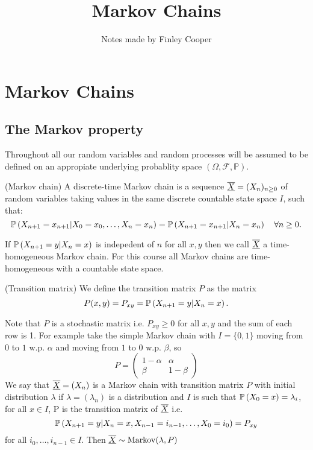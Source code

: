\documentclass{article}
\title{Markov Chains}
\author{Notes made by Finley Cooper}
\begin{document}
  \maketitle
  \newpage
  \tableofcontents
  \newpage
  \section{Markov Chains}
  \subsection{The Markov property}
  Throughout all our random variables and random processes will be assumed to be defined on an appropiate underlying probablity space $ (\Omega, \mathcal F, \mathbb P) $.
  \begin{definition}
  (Markov chain) A discrete-time Markov chain is a sequence $ \underline{\overline{X}}=(X_n)_{n\ge 0} $ of random variables taking values in the same discrete countable state space $ I $, such that:
	  \[
		  \mathbb{P}\left({X_{n+1}=x_{n+1}|X_0=x_0,\dots, X_n=x_n}\right)=\mathbb{P}\left({X_{n+1}=x_{n+1}|X_n=x_n}\right)\quad \forall n\ge 0.
	  \]
  \end{definition}
  If $ \mathbb{P}\left({X_{n+1} = y | X_n = x}\right) $ is indepedent of $ n $ for all $ x,y $ then we call $ \underline{\overline{X}} $ a time-homogeneous Markov chain. For this course all Markov chains are time-homogeneous with a countable state space.\par
\begin{definition}
	(Transition matrix) We define the transition matrix $ P $ as the matrix
	\[
		P(x,y)=P_{xy}=\mathbb{P}\left({X_{n+1}=y|X_n=x}\right).
	\]
\end{definition}
Note that $ P $ is a stochastic matrix i.e. $ P_{xy}\ge 0  $ for all $ x,y $ and the sum of each row is 1.
For example take the simple Markov chain with $ I=\{0,1\} $ moving from $ 0 $ to $ 1 $ w.p. $ \alpha $ and moving from $ 1 $ to $ 0 $ w.p. $ \beta $,
so \[P = 
  \begin{pmatrix}
	  1-\alpha & \alpha \\
	  \beta & 1-\beta 
  \end{pmatrix}
\]
We say that $ \underline{\overline{X}}= (X_n) $ is a Markov chain with transition matrix $ P $ with initial distribution $ \lambda $ if $ \lambda=(\lambda_n) $ is a distribution and $ I $ is such that $ \mathbb{P}\left({X_0=x}\right)=\lambda_i $, for all $ x\in I $, P is the transition matrix of $ \underline{\overline{X}} $ i.e.
\[
	\mathbb{P}\left({X_{n+1}=y|X_n=x,X_{n-1}=i_{n-1},\dots, X_0=i_0}\right)=P_{xy}
\]
for all $ i_0,\dots, i_{n-1}\in I $. Then $ \underline{\overline{X}}\sim \text{Markov}(\lambda, P) $
\end{document}
